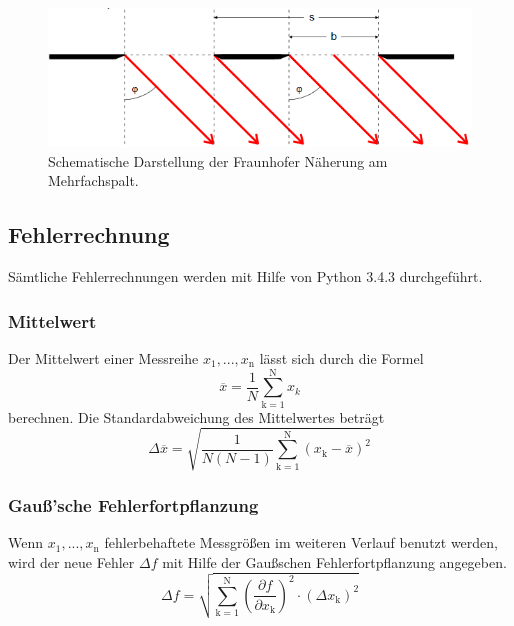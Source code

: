 \begin{figure}[H]
	\includegraphics[width=\linewidth]{Bilder/BeugungAmSpalt.PNG}
	\caption{Schematische Darstellung der Fraunhofer Näherung am Mehrfachspalt. \cite{V406}}
	\label{fig:BeugungAmSpalt}
\end{figure}


\subsection{Fehlerrechnung}
Sämtliche Fehlerrechnungen werden mit Hilfe von Python 3.4.3 durchgeführt.
\subsubsection{Mittelwert}
Der Mittelwert einer Messreihe $x_\text{1}, ... ,x_\text{n}$ lässt sich durch die Formel
\begin{equation}
	\overline{x} = \frac{1}{N} \sum_{\text{k}=1}^\text{N} x_k
	\label{eqn:ave}
\end{equation}
berechnen. Die Standardabweichung des Mittelwertes beträgt
\begin{equation}
	\Delta \overline{x} = \sqrt{ \frac{1}{N(N-1)} \sum_{\text{k}=1}^\text{N} (x_\text{k} - \overline{x})^2}
	\label{eqn:std}
\end{equation}

\subsubsection{Gauß'sche Fehlerfortpflanzung}
Wenn $x_\text{1}, ..., x_\text{n}$ fehlerbehaftete Messgrößen im weiteren Verlauf benutzt werden, wird der neue Fehler $\Delta f$ mit Hilfe der Gaußschen Fehlerfortpflanzung angegeben.
\begin{equation}
	\Delta f = \sqrt{\sum_{\text{k}=1}^\text{N} \left( \frac{ \partial f}{\partial x_\text{k}} \right) ^2 \cdot (\Delta x_\text{k})^2}
	\label{eqn:var}
\end{equation}

